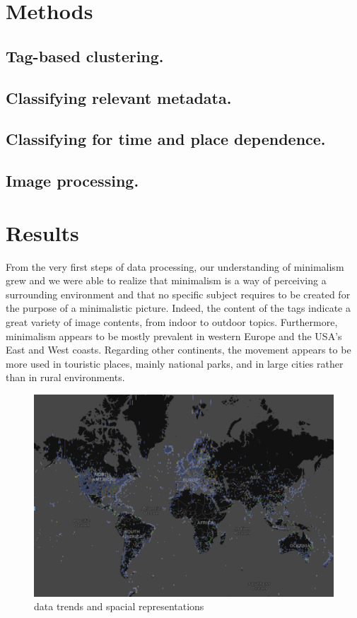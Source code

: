 \documentclass[sigconf]{acmart}
\begin{document}
\section{Methods}
\subsection*{Tag-based clustering.}
\subsection*{Classifying relevant metadata.}
\subsection*{Classifying for time and place dependence.}
\subsection*{Image processing.}
\section{Results}
From the very first steps of data processing, our understanding of minimalism grew and we were able to realize that minimalism is a way of perceiving a surrounding environment and that no specific subject requires to be created for the purpose of a minimalistic picture. Indeed, the content of the tags indicate a great variety of image contents, from indoor to outdoor topics. Furthermore, minimalism appears to be mostly prevalent in western Europe and the USA's East and West coasts. Regarding other continents, the movement appears to be more used in touristic places, mainly national parks, and in large cities rather than in rural environments.
\begin{figure}[h]
 		 \centering
 			 \includegraphics[width=\linewidth]{images/data_trends}
 			 \caption{data trends and spacial representations}
	\end{figure}
\end{document}
